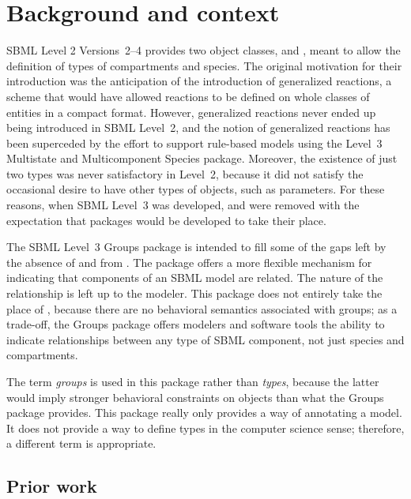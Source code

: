
\section{Background and context}
\label{background}

SBML Level 2 Versions~2--4 provides two object classes, \CompartmentType and \SpeciesType, meant to allow the definition of types of compartments and species. The original motivation for their introduction was the anticipation of the introduction of generalized reactions, a scheme that would have allowed reactions to be defined on whole classes of entities in a compact format. However, generalized reactions never ended up being introduced in SBML Level~2, and the notion of generalized reactions has been superceded by the effort to support rule-based models using the Level~3 Multistate and Multicomponent Species package.  Moreover, the existence of just two types was never satisfactory in Level~2, because it did not satisfy the occasional desire to have other types of objects, such as parameters.  For these reasons, when SBML Level~3 was developed, \CompartmentType and \SpeciesType were removed with the expectation that packages would be developed to take their place.

The SBML Level~3 Groups package is intended to fill some of the gaps left by the absence of \CompartmentType and \SpeciesType from \sbmlthreecore.  The package offers a more flexible mechanism for indicating that components of an SBML model are related.  The nature of the relationship is left up to the modeler.  This package does not entirely take the place of \SpeciesType, because there are no behavioral semantics associated with groups; as a trade-off, the Groups package offers modelers and software tools the ability to indicate relationships between any type of SBML component, not just species and compartments.

The term \emph{groups} is used in this package rather than \emph{types}, because the latter would imply stronger behavioral constraints on objects than what the Groups package provides. This package really only provides a way of annotating a model.  It does not provide a way to define types in the computer science sense; therefore, a different term is appropriate.


\subsection{Prior work}

